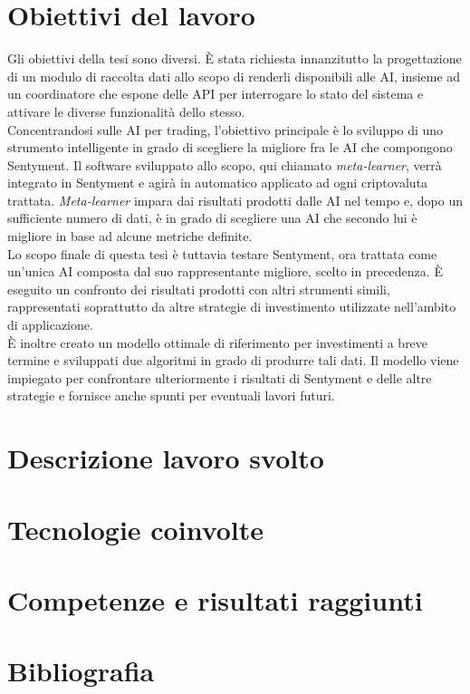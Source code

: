 \documentclass{article}
\begin{document}
\section{Obiettivi del lavoro}
Gli obiettivi della tesi sono diversi. È stata richiesta innanzitutto la progettazione di un modulo di raccolta dati allo scopo di renderli disponibili alle AI, insieme ad un coordinatore che espone delle API per interrogare lo stato del sistema e attivare le diverse funzionalità dello stesso.\\ Concentrandosi sulle AI per trading, l'obiettivo principale è lo sviluppo di uno strumento intelligente in grado di scegliere la migliore fra le AI che compongono Sentyment. Il software sviluppato allo scopo, qui chiamato \textit{meta-learner}, verrà integrato in Sentyment e agirà in automatico applicato ad ogni criptovaluta trattata. \textit{Meta-learner} impara dai risultati prodotti dalle AI nel tempo e, dopo un sufficiente numero di dati, è in grado di scegliere una AI che secondo lui è migliore in base ad alcune metriche definite.\\ Lo scopo finale di questa tesi è tuttavia testare Sentyment, ora trattata come un'unica AI composta dal suo rappresentante migliore, scelto in precedenza. È eseguito un confronto dei risultati prodotti con altri strumenti simili, rappresentati soprattutto da altre strategie di investimento utilizzate nell'ambito di applicazione.\\ È inoltre creato un modello ottimale di riferimento per investimenti a breve termine e sviluppati due algoritmi in grado di produrre tali dati. Il modello viene impiegato per confrontare ulteriormente i risultati di Sentyment e delle altre strategie e fornisce anche spunti per eventuali lavori futuri.

\section{Descrizione lavoro svolto}

\section{Tecnologie coinvolte}

\section{Competenze e risultati raggiunti}

\section{Bibliografia}
\end{document}
